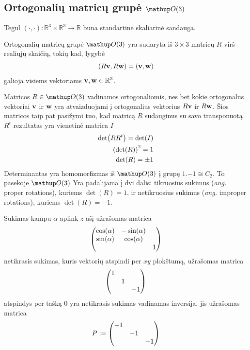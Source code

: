 
\subsection{Ortogonalių matricų grupė \texorpdfstring{$\Orth{3}$}{O(3)}}


Tegul $(\cdot,\cdot) : \mathbb{R}^3 \times \mathbb{R}^3 \to \mathbb{R}$
būna standartinė skaliarinė sandauga.

\begin{definition}
	Ortogonalių matricų grupė $\Orth3$ yra sudaryta iš $3\times3$ matricų
	$R$ virš realiųjų skaičių, tokių kad, lygybė 
	\begin{equation}
		(R \vb v, R \vb w) = (\vb v, \vb w)
	\end{equation}
	galioja visiems vektoriams $\vb v, \vb w \in \mathbb{R}^3$. 
\end{definition}

Matricos $R \in \Orth3$ vadinamos ortogonaliomis,
nes bet kokie ortogonalūs vektoriai $\vb v$ ir $\vb w$
yra atvaizduojami į ortogonalius vektorius $R\vb v$ ir $R\vb w$.
Šios matricos taip pat pasižymi tuo,
kad matricą $R$ sudauginus su savo transponuotą $R^t$
rezultatas yra vienetinė matrica $I$ 
\begin{equation}
	\begin{split}
		\det(RR^t) = \det(I)
		\\
		\qty(\det(R))^2 = 1
		\\
		\det(R) = \pm 1
	\end{split}
\end{equation}
Determinantas yra homomorfizmas iš $\Orth3$ į grupę $\qty{1,-1} \cong C_2$.
To pasekoje $\Orth3$ Yra padalijama į dvi dalis:
tikruosius sukimus (\textit{ang.} proper rotations),
kuriems $\det(R) = 1$,
ir netikruosius sukimus (\textit{ang.} improper rotations),
kuriems $\det(R) = -1$.
\begin{example}
	Sukimas kampu $\alpha$ aplink $z$ ašį užrašomas matrica
	\begin{equation*}
		\mqty(
		\cos(\alpha) & -\sin(\alpha) &   \\
		\sin(\alpha) &  \cos(\alpha) &   \\
			     &		     & 1
		)
	\end{equation*}
	netikrasis sukimas,
	kuris vektorių atspindi per $xy$ plokštumą,
	užrašomas matrica
	\begin{equation*}
		\mqty(
		1 &   &   \\
		  & 1 &   \\
		  &   & -1
		) 
	\end{equation*}
	atspindys per tašką $0$ yra 
	netikrasis sukimas vadinamas inversija,
	jis užrašomas matrica
	\begin{equation*}
		P :=\mqty(
		-1 &    &   \\
		   & -1 &   \\
		   &    & -1
		) 
	\end{equation*}
\end{example}


